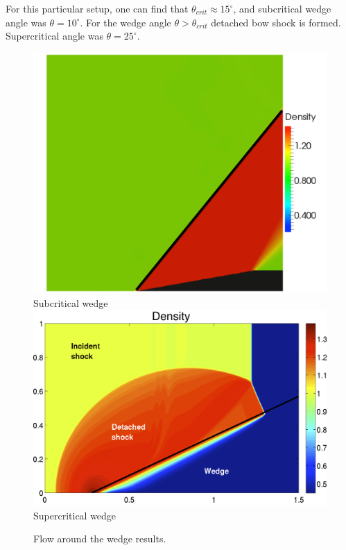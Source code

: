 For this particular setup, one can find that $\theta_{crit} \approx 15^\circ$, and subcritical wedge angle was $\theta = 10^\circ$. For the wedge angle $\theta > \theta_{crit}$ detached bow shock is formed. Supercritical angle was $\theta = 25^\circ$.
\begin{figure}[h!]
\centering \includegraphics[width=0.69\linewidth]{fig/wedge_sub.png}\\
Subcritical wedge\\ [1ex]
\includegraphics[width=0.65\linewidth]{fig/wedge_super.png}\\
Supercritical wedge\\
\caption{Flow around the wedge results. \label{fig:wedge_res}}
\end{figure}

